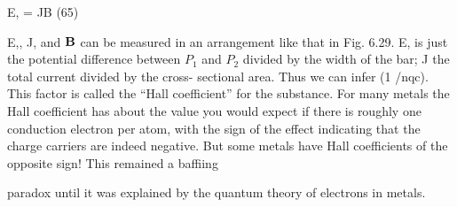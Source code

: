 \begin{equation}
\end{equation}

E, = JB (65)

E,, J, and $\mathbf{B}$ can be measured in an arrangement like that in
Fig. 6.29. E, is just the potential difference between $P_1$ and $P_2$ divided
by the width of the bar; J the total current divided by the cross-
sectional area. Thus we can infer (1 /nqc). This factor is called the
``Hall coefficient'' for the substance. For many metals the Hall
coefficient has about the value you would expect if there is roughly
one conduction electron per atom, with the sign of the effect indicating
that the charge carriers are indeed negative. But some metals
have Hall coefficients of the opposite sign! This remained a baffiing

paradox until it was explained by the quantum theory of electrons
in metals.

\fi
